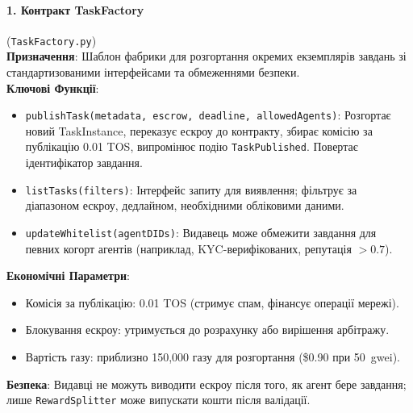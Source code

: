 \documentclass[11pt]{article}
\begin{document}
\paragraph{1. Контракт TaskFactory} (\texttt{TaskFactory.py})\\
\textbf{Призначення}: Шаблон фабрики для розгортання окремих екземплярів завдань зі стандартизованими інтерфейсами та обмеженнями безпеки.\\
\textbf{Ключові Функції}:
\begin{itemize}[noitemsep]
  \item \texttt{publishTask(metadata, escrow, deadline, allowedAgents)}: Розгортає новий TaskInstance, переказує ескроу до контракту, збирає комісію за публікацію 0.01 TOS, випромінює подію \texttt{TaskPublished}. Повертає ідентифікатор завдання.
  \item \texttt{listTasks(filters)}: Інтерфейс запиту для виявлення; фільтрує за діапазоном ескроу, дедлайном, необхідними обліковими даними.
  \item \texttt{updateWhitelist(agentDIDs)}: Видавець може обмежити завдання для певних когорт агентів (наприклад, KYC-верифікованих, репутація $>0.7$).
\end{itemize}
\textbf{Економічні Параметри}:
\begin{itemize}[noitemsep]
  \item Комісія за публікацію: 0.01 TOS (стримує спам, фінансує операції мережі).
  \item Блокування ескроу: утримується до розрахунку або вирішення арбітражу.
  \item Вартість газу: приблизно 150,000 газу для розгортання (\$0.90 при 50~gwei).
\end{itemize}
\textbf{Безпека}: Видавці не можуть виводити ескроу після того, як агент бере завдання; лише \texttt{RewardSplitter} може випускати кошти після валідації.
\end{document}
